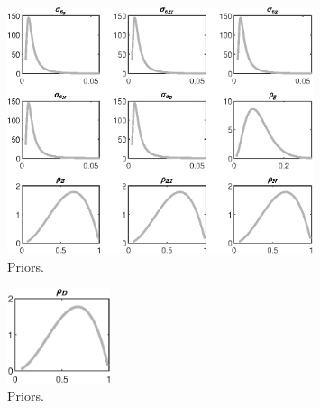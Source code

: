  
\begin{figure}[H]
\centering
\includegraphics[width=0.80\textwidth]{BRS_growth/graphs/BRS_growth_Priors1}
\caption{Priors.}\label{Fig:Priors:1}
\end{figure}
\begin{figure}[H]
\centering
\includegraphics[width=0.27\textwidth]{BRS_growth/graphs/BRS_growth_Priors2}
\caption{Priors.}\label{Fig:Priors:2}
\end{figure}
 
